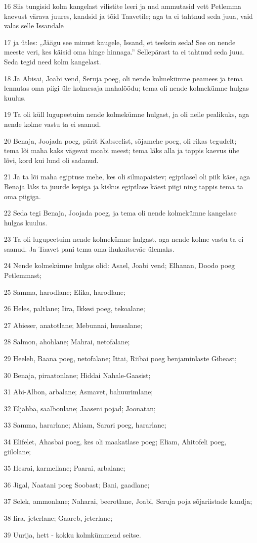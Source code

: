 \par 16 Siis tungisid kolm kangelast vilistite leeri ja nad ammutasid vett Petlemma kaevust värava juures, kandsid ja tõid Taavetile; aga ta ei tahtnud seda juua, vaid valas selle Issandale
\par 17 ja ütles: „Jäägu see minust kaugele, Issand, et teeksin seda! See on nende meeste veri, kes käisid oma hinge hinnaga.” Sellepärast ta ei tahtnud seda juua. Seda tegid need kolm kangelast.
\par 18 Ja Abisai, Joabi vend, Seruja poeg, oli nende kolmekümne peamees ja tema lennutas oma piigi üle kolmesaja mahalöödu; tema oli nende kolmekümne hulgas kuulus.
\par 19 Ta oli küll lugupeetuim nende kolmekümne hulgast, ja oli neile pealikuks, aga nende kolme vastu ta ei saanud.
\par 20 Benaja, Joojada poeg, pärit Kabseelist, sõjamehe poeg, oli rikas tegudelt; tema lõi maha kaks vägevat moabi meest; tema läks alla ja tappis kaevus ühe lõvi, kord kui lund oli sadanud.
\par 21 Ja ta lõi maha egiptuse mehe, kes oli silmapaistev; egiptlasel oli piik käes, aga Benaja läks ta juurde kepiga ja kiskus egiptlase käest piigi ning tappis tema ta oma piigiga.
\par 22 Seda tegi Benaja, Joojada poeg, ja tema oli nende kolmekümne kangelase hulgas kuulus.
\par 23 Ta oli lugupeetuim nende kolmekümne hulgast, aga nende kolme vastu ta ei saanud. Ja Taavet pani tema oma ihukaitseväe ülemaks.
\par 24 Nende kolmekümne hulgas olid: Asael, Joabi vend; Elhanan, Doodo poeg Petlemmast;
\par 25 Samma, harodlane; Elika, harodlane;
\par 26 Heles, paltlane; Iira, Ikkesi poeg, tekoalane;
\par 27 Abieser, anatotlane; Mebunnai, huusalane;
\par 28 Salmon, ahohlane; Mahrai, netofalane;
\par 29 Heeleb, Baana poeg, netofalane; Ittai, Riibai poeg benjaminlaste Gibeast;
\par 30 Benaja, piraatonlane; Hiddai Nahale-Gaasist;
\par 31 Abi-Albon, arbalane; Asmavet, bahuurimlane;
\par 32 Eljahba, saalbonlane; Jaaseni pojad; Joonatan;
\par 33 Samma, hararlane; Ahiam, Sarari poeg, hararlane;
\par 34 Elifelet, Ahasbai poeg, kes oli maakatlase poeg; Eliam, Ahitofeli poeg, giilolane;
\par 35 Hesrai, karmellane; Paarai, arbalane;
\par 36 Jigal, Naatani poeg Soobast; Bani, gaadlane;
\par 37 Selek, ammonlane; Naharai, beerotlane, Joabi, Seruja poja sõjariistade kandja;
\par 38 Iira, jeterlane; Gaareb, jeterlane;
\par 39 Uurija, hett - kokku kolmkümmend seitse.

